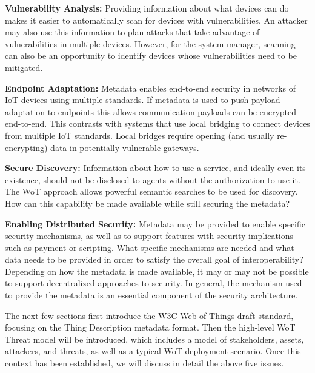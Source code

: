 \noindent\textbf{Vulnerability Analysis:}
Providing information about what devices can do makes it easier to 
automatically scan for devices with vulnerabilities.
An attacker may also use this information to plan attacks that take advantage of 
vulnerabilities in multiple devices. 
However, for the system manager, scanning can also be an opportunity 
to identify devices whose vulnerabilities need to be mitigated.


\noindent\textbf{Endpoint Adaptation:}
Metadata enables end-to-end security in networks of IoT devices using multiple standards.
If metadata is used to push payload adaptation to endpoints this allows 
communication payloads can be encrypted end-to-end.  
This contrasts with systems that use local bridging to connect devices from multiple IoT standards.
Local bridges require opening (and usually re-encrypting) data in potentially-vulnerable gateways.


\noindent\textbf{Secure Discovery:}
Information about how to use a service, 
and ideally even its existence, should not
be disclosed to agents without the authorization to use it.
The WoT approach allows powerful semantic searches to be used for discovery.
How can this capability be made available while still securing the metadata?


\noindent\textbf{Enabling Distributed Security:}
Metadata may be provided to enable specific security mechanisms,
as well as to support features with security implications such as payment or scripting.
What specific mechanisms are needed and what data needs to be provided
in order to satisfy the overall goal of interoperability?
Depending on how the metadata is made available, it may or may not be 
possible to support decentralized approaches to security.
In general, the mechanism used to provide the metadata is
an essential component of the security architecture.

The next few sections first introduce the W3C Web of Things draft standard,
focusing on the Thing Description metadata format.  
Then the high-level WoT Threat model will be introduced,
which includes a model of stakeholders, assets, attackers,
and threats, as well as a typical WoT deployment scenario.
Once this context has been established, we will discuss in detail the above
five issues.

